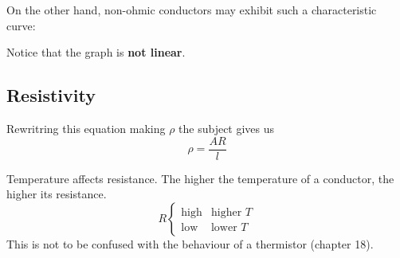 \documentclass[../main.tex]{subfiles}
\begin{document}
	On the other hand, non-ohmic conductors may exhibit such a characteristic curve:
	\begin{center}
		\pgfplotsset{ticks=none}
	\end{center}
	Notice that the graph is \textbf{not linear}.
	
	\subsection{Resistivity}
	Rewritring this equation making \(\rho\) the subject gives us 
	\[
		\rho = \frac{AR}{l}
	\]
	
	Temperature affects resistance. The higher the temperature of a conductor, the higher its resistance.
	\[
	R \begin{cases}
		\text{high} & \text{higher \(T\)} \\
		\text{low} 	& \text{lower \(T\)}
	\end{cases}
	\]
	This is not to be confused with the behaviour of a thermistor (chapter 18).
\end{document}
